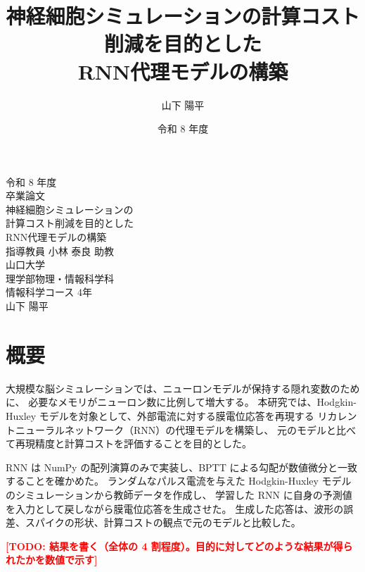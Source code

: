 \documentclass[a4paper,11pt,openany]{ltjsreport}
\title{神経細胞シミュレーションの計算コスト削減を目的とした\\RNN代理モデルの構築}
\author{山下 陽平}
\date{令和 8 年度}
\newcommand{\TODO}[1]{\textcolor{red}{\textbf{[TODO: #1]}}}
\begin{document}
\begin{titlepage}
  \centering
  \vspace*{20mm}
  {\Large 令和 8 年度}\\[15mm]
  {\LARGE 卒業論文}\\[25mm]
  {\LARGE 神経細胞シミュレーションの}\\[3mm]
  {\LARGE 計算コスト削減を目的とした}\\[3mm]
  {\LARGE RNN代理モデルの構築}\\[32mm]
  {\large 指導教員 小林 泰良 助教}\\[20mm]
  {\large 山口大学}\\[3mm]
  {\large 理学部\quad 物理・情報科学科}\\[3mm]
  {\large 情報科学コース 4年}\\[20mm]
  {\large 山下 陽平}
  \vfill
\end{titlepage}

\chapter*{概要}

大規模な脳シミュレーションでは、ニューロンモデルが保持する隠れ変数のために、
必要なメモリがニューロン数に比例して増大する。
本研究では、Hodgkin-Huxley モデルを対象として、外部電流に対する膜電位応答を再現する
リカレントニューラルネットワーク（RNN）の代理モデルを構築し、
元のモデルと比べて再現精度と計算コストを評価することを目的とした。

RNN は NumPy の配列演算のみで実装し、BPTT による勾配が数値微分と一致することを確かめた。
ランダムなパルス電流を与えた Hodgkin-Huxley モデルのシミュレーションから教師データを作成し、
学習した RNN に自身の予測値を入力として戻しながら膜電位応答を生成させた。
生成した応答は、波形の誤差、スパイクの形状、計算コストの観点で元のモデルと比較した。

\TODO{結果を書く（全体の 4 割程度）。目的に対してどのような結果が得られたかを数値で示す}

\tableofcontents
\clearpage

\end{document}
